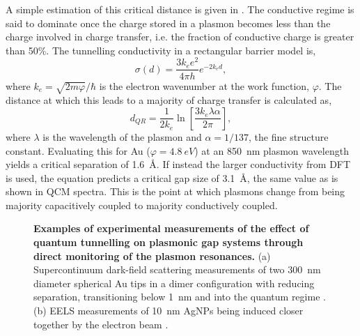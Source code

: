 \documentclass{article}
\begin{document}
A simple estimation of this critical distance is given in \cite{savage2012}. The conductive regime is said to dominate once the charge stored in a plasmon becomes less than the charge involved in charge transfer, i.e. the fraction of conductive charge is greater than 50\%. The tunnelling conductivity in a rectangular barrier model is,
\begin{equation}
	\sigma(d) = \frac{3k_ee^2}{4\pi h} e^{-2k_e d},
\end{equation}
where $k_e=\sqrt{2m\varphi}/\hbar$ is the electron wavenumber at the work function, $\varphi$. The distance at which this leads to a majority of charge transfer is calculated as,
\begin{equation}
	d_{QR} = \frac{1}{2k_e}\ln\left[ \frac{3k_e\lambda\alpha}{2\pi} \right],
\end{equation}
where $\lambda$ is the wavelength of the plasmon and $\alpha=1/137$, the fine structure constant. Evaluating this for Au ($\varphi=\SI{4.8}{eV}$) at an \SI{850}{nm} plasmon wavelength yields a critical separation of \SI{1.6}{\angstrom}. If instead the larger conductivity from DFT is used, the equation predicts a critical gap size of \SI{3.1}{\angstrom}, the same value as is shown in QCM spectra. This is the point at which plasmons change from being majority capacitively coupled to majority conductively coupled.

\begin{figure}[bt]
\centering
{}
\caption[Examples of experimental measurements of the effect of quantum tunnelling on plasmonic gap systems]{\textbf{Examples of experimental measurements of the effect of quantum tunnelling on plasmonic gap systems through direct monitoring of the plasmon resonances.} (a) Supercontinuum dark-field scattering measurements of two \SI{300}{nm} diameter spherical Au tips in a dimer configuration with reducing separation, transitioning below \SI{1}{nm} and into the quantum regime \cite{savage2012}. (b) EELS measurements of \SI{10}{nm} AgNPs being induced closer together by the electron beam \cite{scholl2013}.}
\label{fig:tunnelling_plasmonics}
\end{figure}
\end{document}
